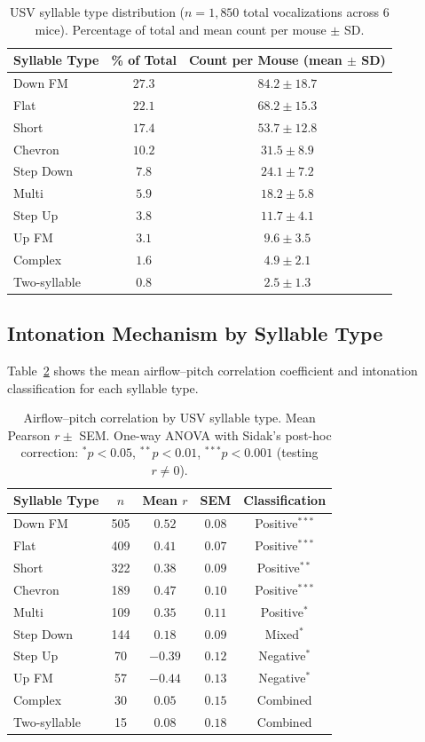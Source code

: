 \documentclass[11pt]{article}
\begin{document}
\begin{table}[H]
\centering
\caption{USV syllable type distribution ($n = 1{,}850$ total vocalizations across 6 mice). Percentage of total and mean count per mouse $\pm$ SD.}
\label{tab:syllable_dist}
\begin{tabular}{lcc}
\toprule
Syllable Type & \% of Total & Count per Mouse (mean $\pm$ SD) \\
\midrule
Down FM & $27.3$ & $84.2 \pm 18.7$ \\
Flat & $22.1$ & $68.2 \pm 15.3$ \\
Short & $17.4$ & $53.7 \pm 12.8$ \\
Chevron & $10.2$ & $31.5 \pm 8.9$ \\
Step Down & $7.8$ & $24.1 \pm 7.2$ \\
Multi & $5.9$ & $18.2 \pm 5.8$ \\
Step Up & $3.8$ & $11.7 \pm 4.1$ \\
Up FM & $3.1$ & $9.6 \pm 3.5$ \\
Complex & $1.6$ & $4.9 \pm 2.1$ \\
Two-syllable & $0.8$ & $2.5 \pm 1.3$ \\
\bottomrule
\end{tabular}
\end{table}

\subsection{Intonation Mechanism by Syllable Type}

Table~\ref{tab:intonation} shows the mean airflow--pitch correlation coefficient and intonation classification for each syllable type.

\begin{table}[H]
\centering
\caption{Airflow--pitch correlation by USV syllable type. Mean Pearson $r \pm$ SEM. One-way ANOVA with Sidak's post-hoc correction: $^*p < 0.05$, $^{**}p < 0.01$, $^{***}p < 0.001$ (testing $r \neq 0$).}
\label{tab:intonation}
\begin{tabular}{lcccc}
\toprule
Syllable Type & $n$ & Mean $r$ & SEM & Classification \\
\midrule
Down FM & 505 & $0.52$ & $0.08$ & Positive$^{***}$ \\
Flat & 409 & $0.41$ & $0.07$ & Positive$^{***}$ \\
Short & 322 & $0.38$ & $0.09$ & Positive$^{**}$ \\
Chevron & 189 & $0.47$ & $0.10$ & Positive$^{***}$ \\
Multi & 109 & $0.35$ & $0.11$ & Positive$^{*}$ \\
Step Down & 144 & $0.18$ & $0.09$ & Mixed$^{*}$ \\
Step Up & 70 & $-0.39$ & $0.12$ & Negative$^{*}$ \\
Up FM & 57 & $-0.44$ & $0.13$ & Negative$^{*}$ \\
Complex & 30 & $0.05$ & $0.15$ & Combined \\
Two-syllable & 15 & $0.08$ & $0.18$ & Combined \\
\bottomrule
\end{tabular}
\end{table}
\end{document}
